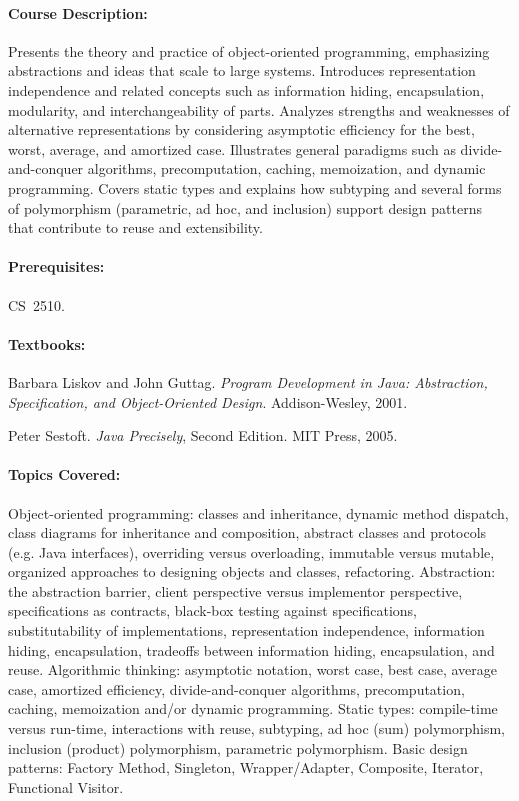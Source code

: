 \documentclass[11pt]{article}
\begin{document}
\paragraph{Course Description:}
%
Presents the theory and practice of object-oriented programming,
emphasizing abstractions and ideas that scale to large systems.
Introduces representation independence and related concepts such as
information hiding, encapsulation, modularity, and interchangeability
of parts.  Analyzes strengths and weaknesses of alternative
representations by considering asymptotic efficiency for the best,
worst, average, and amortized case.  Illustrates general paradigms
such as divide-and-conquer algorithms, precomputation, caching,
memoization, and dynamic programming.  Covers static types and
explains how subtyping and several forms of polymorphism
(parametric, ad hoc, and inclusion) support design patterns that
contribute to reuse and extensibility.

\paragraph{Prerequisites:}
%
CS~2510. 

\paragraph{Textbooks:}
%
\noindent
Barbara Liskov and John Guttag.
\emph{Program Development in Java: Abstraction, Specification,
and Object-Oriented Design}.
Addison-Wesley, 2001.

\noindent
Peter Sestoft.  \emph{Java Precisely}, Second Edition.
MIT Press, 2005.


\paragraph{Topics Covered:}
%
Object-oriented programming:
%
classes and inheritance,
dynamic method dispatch,
class diagrams for inheritance and composition,
abstract classes and protocols (e.g. Java interfaces),
overriding versus overloading,
immutable versus mutable,
organized approaches to designing objects and classes,
refactoring.
%
Abstraction: 
%
the abstraction barrier,
client perspective versus implementor perspective,
specifications as contracts,
black-box testing against specifications,
substitutability of implementations,
representation independence,
information hiding,
encapsulation,
tradeoffs between information hiding, encapsulation, and reuse.
%
Algorithmic thinking:
%
asymptotic notation,
worst case, best case, average case,
amortized efficiency,
divide-and-conquer algorithms,
precomputation,
caching,
memoization and/or dynamic programming.
%
Static types:
%
compile-time versus run-time,
interactions with reuse,
subtyping,
ad hoc (sum) polymorphism, 
inclusion (product) polymorphism,
parametric polymorphism.
%
Basic design patterns:
%
Factory Method,
Singleton,
Wrapper/Adapter,
Composite,
Iterator,
Functional Visitor.
\end{document}
